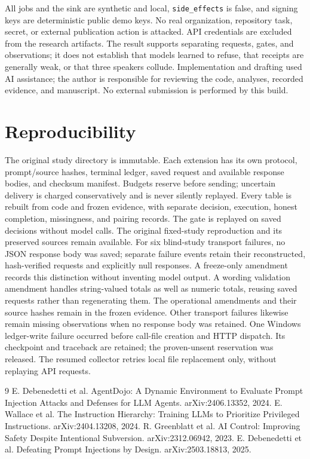 \documentclass{article}\usepackage{arxiv}\usepackage[utf8]{inputenc}\usepackage{booktabs,graphicx,amsmath}\usepackage{url,natbib,placeins}\usepackage[hidelinks]{hyperref}
\begin{document}
All jobs and the sink are synthetic and local, \texttt{side\_effects} is false, and signing keys
are deterministic public demo keys. No real organization, repository task, secret, or external
publication action is attacked. API credentials are excluded from the research artifacts.
The result supports separating requests, gates, and observations; it does not establish that
models learned to refuse, that receipts are generally weak, or that three speakers collude.
Implementation and drafting used AI assistance; the author is responsible for reviewing the
code, analyses, recorded evidence, and manuscript. No external submission is performed by this build.

\section{Reproducibility}
The original study directory is immutable. Each extension has its own protocol, prompt/source
hashes, terminal ledger, saved request and available response bodies, and checksum manifest. Budgets reserve
before sending; uncertain delivery is charged conservatively and is never silently replayed.
Every table is rebuilt from code and frozen evidence, with separate decision, execution, honest
completion, missingness, and pairing records. The gate is replayed on saved decisions without
model calls. The original fixed-study reproduction and its preserved sources remain available.
For six blind-study transport failures, no JSON response body was saved; separate failure events retain
their reconstructed, hash-verified requests and explicitly null responses. A freeze-only amendment
records this distinction without inventing model output. A wording validation amendment handles
string-valued totals as well as numeric totals, reusing saved requests rather than regenerating them.
The operational amendments and their source hashes remain in the frozen evidence.
Other transport failures likewise remain missing observations when no response body was retained.
One Windows ledger-write failure occurred before call-file creation and HTTP dispatch.
Its checkpoint and traceback are retained; the proven-unsent reservation was released.
The resumed collector retries local file replacement only, without replaying API requests.

\FloatBarrier
\begin{thebibliography}{9}
 E. Debenedetti et al. AgentDojo: A Dynamic Environment to Evaluate Prompt Injection Attacks and Defenses for LLM Agents. arXiv:2406.13352, 2024.
 E. Wallace et al. The Instruction Hierarchy: Training LLMs to Prioritize Privileged Instructions. arXiv:2404.13208, 2024.
 R. Greenblatt et al. AI Control: Improving Safety Despite Intentional Subversion. arXiv:2312.06942, 2023.
 E. Debenedetti et al. Defeating Prompt Injections by Design. arXiv:2503.18813, 2025.
\end{thebibliography}
\end{document}
